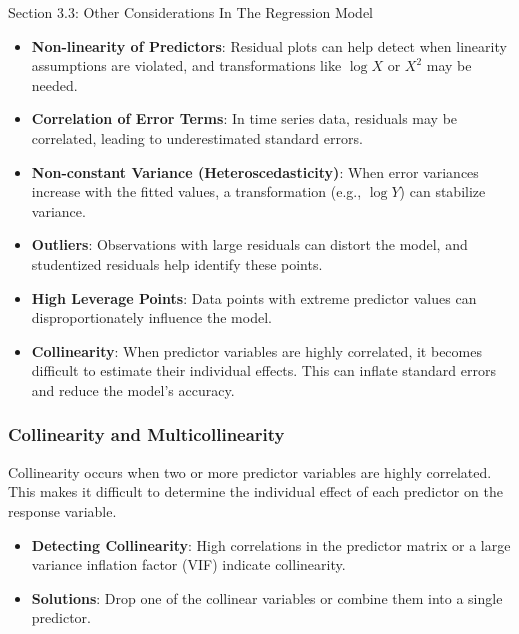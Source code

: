 \begin{notes}{Section 3.3: Other Considerations In The Regression Model}
    \begin{highlight}
        \begin{itemize}
            \item \textbf{Non-linearity of Predictors}: Residual plots can help detect when linearity assumptions are violated, and transformations like $\log X$ or $X^2$ may be needed.
            \item \textbf{Correlation of Error Terms}: In time series data, residuals may be correlated, leading to underestimated standard errors.
            \item \textbf{Non-constant Variance (Heteroscedasticity)}: When error variances increase with the fitted values, a transformation (e.g., $\log Y$) can stabilize variance.
            \item \textbf{Outliers}: Observations with large residuals can distort the model, and studentized residuals help identify these points.
            \item \textbf{High Leverage Points}: Data points with extreme predictor values can disproportionately influence the model.
            \item \textbf{Collinearity}: When predictor variables are highly correlated, it becomes difficult to estimate their individual effects. This can inflate standard errors and reduce the model’s accuracy.
        \end{itemize}
    \end{highlight}
    
    \subsubsection*{Collinearity and Multicollinearity}
    
    Collinearity occurs when two or more predictor variables are highly correlated. This makes it difficult to determine the individual effect of each predictor on the response variable.
    
    \begin{highlight}
        \begin{itemize}
            \item \textbf{Detecting Collinearity}: High correlations in the predictor matrix or a large variance inflation factor (VIF) indicate collinearity.
            \item \textbf{Solutions}: Drop one of the collinear variables or combine them into a single predictor.
        \end{itemize}
    \end{highlight}
\end{notes}